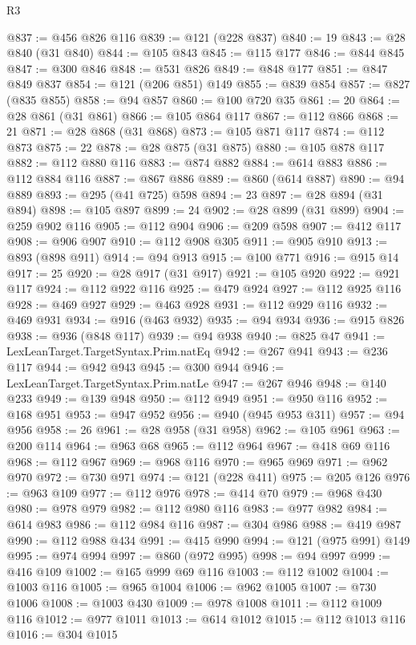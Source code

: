 \begin{lexlean}{R3}
\begin{coremodule}
@837 := @456 @826 @116
@839 := @121 (@228 @837)
@840 := 19
@843 := @28 @840 (@31 @840)
@844 := @105 @843
@845 := @115 @177
@846 := @844 @845
@847 := @300 @846
@848 := @531 @826
@849 := @848 @177
@851 := @847 @849 @837
@854 := @121 (@206 @851) @149
@855 := @839 @854
@857 := @827 (@835 @855)
@858 := @94 @857
@860 := @100 @720 @35
@861 := 20
@864 := @28 @861 (@31 @861)
@866 := @105 @864 @117
@867 := @112 @866
@868 := 21
@871 := @28 @868 (@31 @868)
@873 := @105 @871 @117
@874 := @112 @873
@875 := 22
@878 := @28 @875 (@31 @875)
@880 := @105 @878 @117
@882 := @112 @880 @116
@883 := @874 @882
@884 := @614 @883
@886 := @112 @884 @116
@887 := @867 @886
@889 := @860 (@614 @887)
@890 := @94 @889
@893 := @295 (@41 @725) @598
@894 := 23
@897 := @28 @894 (@31 @894)
@898 := @105 @897
@899 := 24
@902 := @28 @899 (@31 @899)
@904 := @259 @902 @116
@905 := @112 @904
@906 := @209 @598
@907 := @412 @117
@908 := @906 @907
@910 := @112 @908 @305
@911 := @905 @910
@913 := @893 (@898 @911)
@914 := @94 @913
@915 := @100 @771
@916 := @915 @14
@917 := 25
@920 := @28 @917 (@31 @917)
@921 := @105 @920
@922 := @921 @117
@924 := @112 @922 @116
@925 := @479 @924
@927 := @112 @925 @116
@928 := @469 @927
@929 := @463 @928
@931 := @112 @929 @116
@932 := @469 @931
@934 := @916 (@463 @932)
@935 := @94 @934
@936 := @915 @826
@938 := @936 (@848 @117)
@939 := @94 @938
@940 := @825 @47
@941 := LexLeanTarget.TargetSyntax.Prim.natEq
@942 := @267 @941
@943 := @236 @117
@944 := @942 @943
@945 := @300 @944
@946 := LexLeanTarget.TargetSyntax.Prim.natLe
@947 := @267 @946
@948 := @140 @233
@949 := @139 @948
@950 := @112 @949
@951 := @950 @116
@952 := @168 @951
@953 := @947 @952
@956 := @940 (@945 @953 @311)
@957 := @94 @956
@958 := 26
@961 := @28 @958 (@31 @958)
@962 := @105 @961
@963 := @200 @114
@964 := @963 @68
@965 := @112 @964
@967 := @418 @69 @116
@968 := @112 @967
@969 := @968 @116
@970 := @965 @969
@971 := @962 @970
@972 := @730 @971
@974 := @121 (@228 @411)
@975 := @205 @126
@976 := @963 @109
@977 := @112 @976
@978 := @414 @70
@979 := @968 @430
@980 := @978 @979
@982 := @112 @980 @116
@983 := @977 @982
@984 := @614 @983
@986 := @112 @984 @116
@987 := @304 @986
@988 := @419 @987
@990 := @112 @988 @434
@991 := @415 @990
@994 := @121 (@975 @991) @149
@995 := @974 @994
@997 := @860 (@972 @995)
@998 := @94 @997
@999 := @416 @109
@1002 := @165 @999 @69 @116
@1003 := @112 @1002
@1004 := @1003 @116
@1005 := @965 @1004
@1006 := @962 @1005
@1007 := @730 @1006
@1008 := @1003 @430
@1009 := @978 @1008
@1011 := @112 @1009 @116
@1012 := @977 @1011
@1013 := @614 @1012
@1015 := @112 @1013 @116
@1016 := @304 @1015

\end{coremodule}
\end{lexlean}
